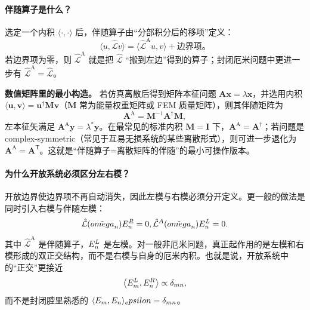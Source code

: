 \paragraph{伴随算子是什么？} 选定一个内积 $\langle\cdot,\cdot\rangle$ 后，伴随算子由“分部积分后的移项”定义：
\begin{equation}
\langle u,\hat{\mathcal L}v\rangle = \langle \hat{\mathcal L}^{\mathrm{A}}u, v\rangle + \text{边界项}。
\label{eq:adjoint_def_appendix}
\end{equation}
若边界项为零，则 $\hat{\mathcal L}^{\mathrm{A}}$ 就是把 $\hat{\mathcal L}$ “搬到左边”得到的算子；封闭厄米问题中更进一步有 $\hat{\mathcal L}^{\mathrm{A}}=\hat{\mathcal L}$。

\begin{ExampleBox}
\textbf{数值矩阵里的最小构造。} 若仿真离散后得到矩阵本征问题 $\bm A\bm x=\lambda\bm x$，并选用内积 $\langle\bm u,\bm v\rangle=\bm u^{\dagger}\bm M\bm v$（$\bm M$ 常为能量权重矩阵或 FEM 质量矩阵），则其伴随矩阵为
\[
\bm A^{\mathrm{A}}=\bm M^{-1}\bm A^{\dagger}\bm M,
\]
左本征矢满足 $\bm A^{\mathrm{A}}\bm y=\lambda^*\bm y$。在最常见的标准内积 $\bm M=\bm I$ 下，$\bm A^{\mathrm{A}}=\bm A^{\dagger}$；若问题是 complex-symmetric（常见于互易无损系统的某些离散形式），则可进一步退化为 $\bm A^{\mathrm{A}}=\bm A^{\mathsf T}$。这就是“伴随算子=离散矩阵的伴随”的最小可操作版本。
\end{ExampleBox}

\paragraph{为什么开放系统必须区分左右模？} 开放边界使边界项不再自动消失，因此左模与右模必须分开定义。更一般的做法是同时引入右模与伴随左模：
\begin{equation}
\hat{\mathcal L}(\tilde{\omega}_n)\E_n^{\mathrm{R}}=0,
\qquad
\hat{\mathcal L}^{\mathrm{A}}(\tilde{\omega}_n)\E_n^{\mathrm{L}}=0.
\label{eq:left_right_modes_appendix}
\end{equation}
其中 $\hat{\mathcal L}^{\mathrm{A}}$ 是伴随算子，$E_n^{L}$ 是左模。对一般非厄米问题，真正起作用的是左模和右模形成的双正交结构，而不是右模与自身的厄米内积。也就是说，开放系统中的“正交”更接近
\begin{equation}
\left\langle E_m^{L},E_n^{R}\right\rangle
\propto
\delta_{mn},
\label{eq:biorthogonality_appendix}
\end{equation}
而不是封闭腔里熟悉的 $\langle E_m,E_n\rangle_epsilon=\delta_{mn}$。

